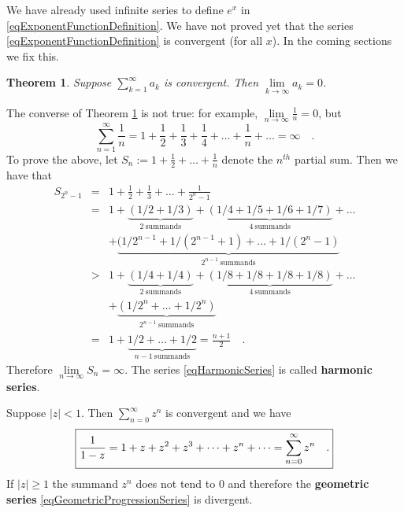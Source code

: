 \documentclass[12pt]{book}
\newcommand{\importantFormula}[1]{\begin{equation} \boxed{#1} \end{equation}}
\newtheorem{theorem}{Theorem}[section]
\renewcommand{\emph}{\textbf}
\begin{document}
We have already used infinite series to define $e^x$ in \eqref{eqExponentFunctionDefinition}. We have not proved yet that the series \eqref{eqExponentFunctionDefinition} is convergent (for all $x$). In the coming sections we fix this.

\begin{theorem}\label{thSummandsConvergentSeriesTendToZero}
Suppose $\sum\limits_{k=1}^\infty a_k$ is convergent. Then $\lim\limits_{k\to \infty } a_k=0$.
\end{theorem}

The converse of Theorem \ref{thSummandsConvergentSeriesTendToZero} is not true: for example, $\lim\limits_{n\to \infty} \frac{1}{n}=0$, but 
\begin{equation}\label{eqHarmonicSeries}
\sum_{n=1}^{\infty}\frac{1}n= 1+\frac{1}2+\frac13+\frac14+\dots +\frac1n+\dots=\infty\quad .
\end{equation}
To prove the above, let $S_n:=1+\frac{1}2+\dots +\frac{1}n$ denote the $n^{th}$ partial sum. Then we have that
\begin{equation*}
\begin{array}{rcl}
S_{2^n-1}&=&1+\frac{1}2+\frac13 +\dots +\frac{1}{2^n-1}\\
&=& 1+ \underbrace{\left(1/2+ 1/3\right)}_{\mathrm{2~summands}} +\underbrace{(1/4 +1/5+1/6+1/7)}_{\mathrm{4~summands}}+\dots \\
&&+ \underbrace{(1/2^{n-1}+1/(2^{n-1}+1)+\dots +1/(2^{n}-1)}_{2^{n-1}\mathrm{~summands}}\\
&>& 1+ \underbrace{\left(1/4+1/4\right)}_{\mathrm{2~summands}} +\underbrace{(1/8+1/8+1/8+1/8)}_{\mathrm{4~summands}}+\dots \\
&& + \underbrace{(1/2^{n}+\dots +1/2^{n})}_{2^{n-1}\mathrm{~summands}}\\
&=&1+\underbrace{  1/2+\dots +1/2}_{n-1\mathrm{~summands}}= \frac{n+1}2\quad . 
\end{array}
\end{equation*}
Therefore $\lim\limits_{n\to \infty} S_{n}=\infty $. The series \eqref{eqHarmonicSeries} is called \emph{harmonic series}.

Suppose $|z|<1$. Then $\sum_{n=0}^{\infty} z^n$ is convergent and we have
\importantFormula{
\label{eqGeometricProgressionSeries}
\frac{1}{1-z}=1+z+z^2+z^3+\dots +z^n+\dots= \sum_{n=0}^{\infty} z^n\quad.
}
If $|z|\geq 1$ the summand $z^n$ does not tend to $0$ and therefore the \emph{geometric series} \eqref{eqGeometricProgressionSeries} is divergent. 
\end{document}
